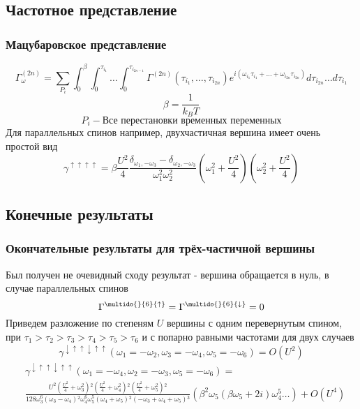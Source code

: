 \documentclass{beamer}
\begin{document}
\subsection{Частотное представление}
\begin{frame}
 \frametitle{Мацубаровское представление}
 \pause
 \scriptsize\[ \Gamma_\omega^{(2n)} = \sum_{P_i} \int_0^\beta\int_0^{\tau_{i_1}}\dots\int_0^{\tau_{i_{2n-1}}}\Gamma^{(2n)}(\tau_{i_1},\dots,\tau_{i_{2n}})
  e^{i(\omega_{i_1}\tau_{i_1}+\dots+\omega_{i_{2n}}\tau_{i_{2n}})}d\tau_{i_{2n}}\dots d\tau_{i_1} \]
 \pause
 \[ \beta = \frac{1}{k_B T} \] \pause
 \[ P_i  - \text{Все перестановки временных переменных} \] \pause
 Для параллельных спинов например, двухчастичная вершина имеет очень простой вид
 \[ \gamma^{\uparrow\uparrow\uparrow\uparrow} = \beta \frac{U^2}{4}\frac{\delta_{\omega_1,-\omega_3}-\delta_{\omega_2,-\omega_3}}{\omega_1^2\omega_2^2}
  (\omega_1^2+\frac{U^2}{4})(\omega_2^2+\frac{U^2}{4}) \]
\end{frame}

\subsection{Конечные результаты}
\begin{frame}
 \frametitle{Окончательные результаты для трёх-частичной вершины}\pause
 Был получен не очевидный сходу результат - вершина обращается в нуль, в случае параллельных спинов
 \[ \Gamma^{\multido{}{6}{\uparrow}} = \Gamma^{\multido{}{6}{\downarrow}} = 0 \]\pause
 Приведем разложение по степеням $U$ вершины с одним перевернутым спином, при $\tau_1>\tau_2>\tau_3>\tau_4>\tau_5>\tau_6$ и с попарно равными частотами для двух случаев
 \pause
 \[ \gamma^{\downarrow\uparrow\uparrow\downarrow\uparrow\uparrow}(\omega_1=-\omega_2,\omega_3=-\omega_4,\omega_5=-\omega_6) = O(U^2) \] \pause
 \tiny\begin{align*} & \gamma^{\downarrow\uparrow\uparrow\downarrow\uparrow\uparrow}(\omega_1=-\omega_4,\omega_2 =-\omega_3,\omega_5=-\omega_6) = \\
    & \frac{U^2 \left(\frac{U^2}{4}+\omega _3^2\right){}^2 \left(\frac{U^2}{4}+ \omega _4^2\right){}^2 \left(\frac{U^2}{4}+\omega _5^2\right){}^2 }
      {128 \omega _3^6 \left(\omega _3-\omega _4\right){}^2 \omega _4^6 \omega _5^5 \left(\omega _4+\omega _5\right){}^2 \left(-\omega
   _3+\omega _4+\omega _5\right){}^3} \left(\beta^2 \omega _5 \left(\beta  \omega _5+2 i\right) \omega _4^5 \dots \right) + O(U^4) \end{align*}
\end{frame}
\end{document}

